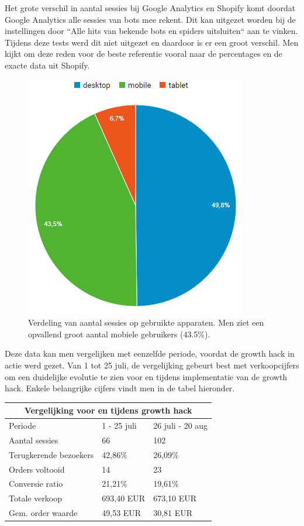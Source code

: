 Het grote verschil in aantal sessies bij Google Analytics en Shopify komt doordat Google Analytics alle sessies van bots mee rekent. Dit kan uitgezet worden bij de instellingen door ``Alle hits van bekende bots en spiders uitsluiten`` aan te vinken. Tijdens deze tests werd dit niet uitgezet en daardoor is er een groot verschil. Men kijkt om deze reden voor de beste referentie vooral naar 
de percentages en de exacte data uit Shopify.

\begin{figure}
	\includegraphics[scale=0.7]{img/sessies-per-apparaat.png}
	\centering
	\caption{Verdeling van aantal sessies op gebruikte apparaten. Men ziet een opvallend groot aantal mobiele gebruikers (43.5\%).}
	\label{fig:sessies-per-apparaat}
\end{figure}

Deze data kan men vergelijken met eenzelfde periode, voordat de growth hack in actie werd gezet. Van 1 tot 25 juli, de vergelijking gebeurt best met verkoopcijfers om een duidelijke evolutie te zien voor en tijdens implementatie van  de growth hack. Enkele belangrijke cijfers vindt men in de tabel hieronder.


\begin{tabular}{ |p{4cm}||p{3cm}|p{3cm}|  }
	\hline
	\multicolumn{3}{|c|}{Vergelijking voor en tijdens growth hack} \\
	\hline
	Periode & 1 - 25 juli &26 juli - 20 aug\\
	\hline
	Aantal sessies   & 66    &102\\
	Terugkerende bezoekers   & 42,86\%    &26,09\%\\
	Orders voltooid&   14  & 23\\
	Conversie ratio &21,21\% & 19,61\%\\
	Totale verkoop    &693,40 EUR & 673,10 EUR\\
	Gem. order waarde    &49,53  EUR& 30,81 EUR\\
	\hline
\end{tabular}

